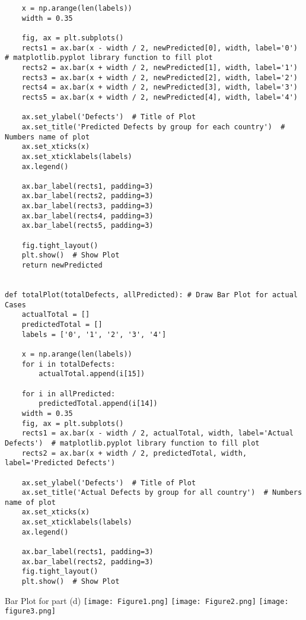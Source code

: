 \documentclass[a4 paper]{article}
\numberwithin{equation}{section}
\newcommand{\0}{\mathbf{0}}
\begin{document}
\begin{itemize}
\begin{lstlisting}
    x = np.arange(len(labels))
    width = 0.35

    fig, ax = plt.subplots()
    rects1 = ax.bar(x - width / 2, newPredicted[0], width, label='0')  # matplotlib.pyplot library function to fill plot
    rects2 = ax.bar(x + width / 2, newPredicted[1], width, label='1')
    rects3 = ax.bar(x + width / 2, newPredicted[2], width, label='2')
    rects4 = ax.bar(x + width / 2, newPredicted[3], width, label='3')
    rects5 = ax.bar(x + width / 2, newPredicted[4], width, label='4')

    ax.set_ylabel('Defects')  # Title of Plot
    ax.set_title('Predicted Defects by group for each country')  # Numbers name of plot
    ax.set_xticks(x)
    ax.set_xticklabels(labels)
    ax.legend()

    ax.bar_label(rects1, padding=3)
    ax.bar_label(rects2, padding=3)
    ax.bar_label(rects3, padding=3)
    ax.bar_label(rects4, padding=3)
    ax.bar_label(rects5, padding=3)

    fig.tight_layout()
    plt.show()  # Show Plot
    return newPredicted
    
    
def totalPlot(totalDefects, allPredicted): # Draw Bar Plot for actual Cases
    actualTotal = []
    predictedTotal = []
    labels = ['0', '1', '2', '3', '4']

    x = np.arange(len(labels))
    for i in totalDefects:
        actualTotal.append(i[15])

    for i in allPredicted:
        predictedTotal.append(i[14])
    width = 0.35
    fig, ax = plt.subplots()
    rects1 = ax.bar(x - width / 2, actualTotal, width, label='Actual Defects')  # matplotlib.pyplot library function to fill plot
    rects2 = ax.bar(x + width / 2, predictedTotal, width, label='Predicted Defects')

    ax.set_ylabel('Defects')  # Title of Plot
    ax.set_title('Actual Defects by group for all country')  # Numbers name of plot
    ax.set_xticks(x)
    ax.set_xticklabels(labels)
    ax.legend()

    ax.bar_label(rects1, padding=3)
    ax.bar_label(rects2, padding=3)
    fig.tight_layout()
    plt.show()  # Show Plot
        \end{lstlisting}
	\end{itemize}
	Bar Plot for part (d)
	\centering
    \texttt{[image: Figure1.png]}
    \centering
    \texttt{[image: Figure2.png]}
	\centering
    \texttt{[image: figure3.png]}
\end{document}
